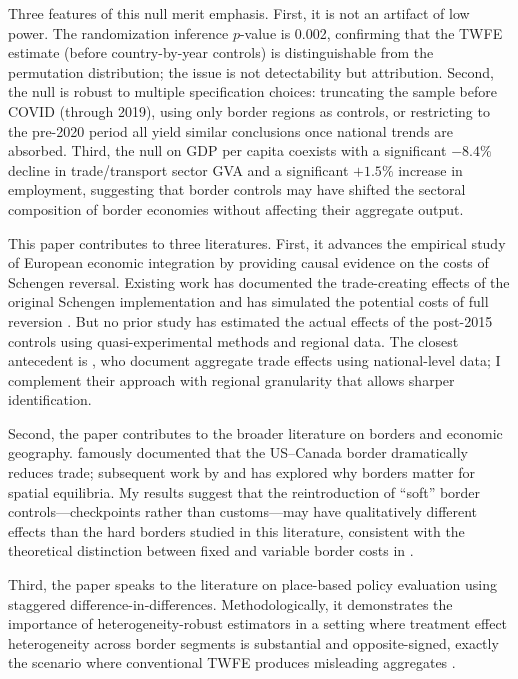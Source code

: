 \documentclass[12pt]{article}
\begin{document}
Three features of this null merit emphasis. First, it is not an artifact of low power. The randomization inference $p$-value is 0.002, confirming that the TWFE estimate (before country-by-year controls) is distinguishable from the permutation distribution; the issue is not detectability but attribution. Second, the null is robust to multiple specification choices: truncating the sample before COVID (through 2019), using only border regions as controls, or restricting to the pre-2020 period all yield similar conclusions once national trends are absorbed. Third, the null on GDP per capita coexists with a significant $-8.4\%$ decline in trade/transport sector GVA and a significant $+1.5\%$ increase in employment, suggesting that border controls may have shifted the sectoral composition of border economies without affecting their aggregate output.

This paper contributes to three literatures. First, it advances the empirical study of European economic integration by providing causal evidence on the costs of Schengen reversal. Existing work has documented the trade-creating effects of the original Schengen implementation \citep{Davis2021, Felbermayr2018} and has simulated the potential costs of full reversion \citep{Aussilloux2016, Boehmer2016}. But no prior study has estimated the actual effects of the post-2015 controls using quasi-experimental methods and regional data. The closest antecedent is \cite{Ademmer2017}, who document aggregate trade effects using national-level data; I complement their approach with regional granularity that allows sharper identification.

Second, the paper contributes to the broader literature on borders and economic geography. \cite{McCallum1995} famously documented that the US--Canada border dramatically reduces trade; subsequent work by \cite{AndersonVW2003} and \cite{Redding2015} has explored why borders matter for spatial equilibria. My results suggest that the reintroduction of ``soft'' border controls---checkpoints rather than customs---may have qualitatively different effects than the hard borders studied in this literature, consistent with the theoretical distinction between fixed and variable border costs in \cite{Anderson2004}.

Third, the paper speaks to the literature on place-based policy evaluation using staggered difference-in-differences. Methodologically, it demonstrates the importance of heterogeneity-robust estimators in a setting where treatment effect heterogeneity across border segments is substantial and opposite-signed, exactly the scenario where conventional TWFE produces misleading aggregates \citep{deCF2020, GoodmanBacon2021, BJS2021}.
\end{document}
